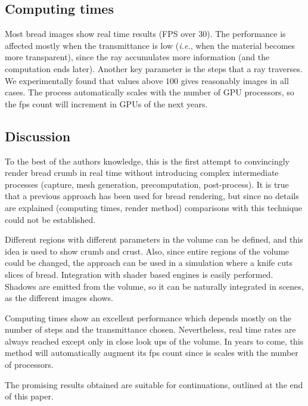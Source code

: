 \documentclass[oneside,a4paper,english,links]{amca}
\begin{document}
\subsection{Computing times}
Most bread images show real time results (FPS over 30). The performance is affected mostly when the transmittance is low ({\em i.e.}, when the material becomes more transparent), since the ray accumulates more information (and the computation ends later). Another key parameter is the steps that a ray traverses. We experimentally found that values above $100$ gives reasonably images in all cases. The process automatically scales with the number of GPU processors, so the fps count will increment in GPUs of the next years.

\subsection{Discussion}
To the best of the authors knowledge, this is the first attempt to convincingly render bread crumb in real time without introducing complex intermediate processes (capture, mesh generation, precomputation, post-process). It is true that a previous approach \citep{Cho2007} has been used for bread rendering, but since no details are explained (computing times, render method) comparisons with this technique could not be established.

Different regions with different parameters in the volume can be defined, and this idea is used to show crumb and crust. Also, since entire regions of the volume could be changed, the approach can be used in a simulation where a knife cuts slices of bread. Integration with shader based engines is easily performed. Shadows are emitted from the volume, so it can be naturally integrated in scenes, as the different images shows.

Computing times show an excellent performance which depends mostly on the number of steps and the transmittance chosen. Nevertheless, real time rates are always reached except only in close look ups of the volume. In years to come, this method will automatically augment its fps count since is scales with the number of processors.

The promising results obtained are suitable for continuations, outlined at the end of this paper.



\end{document}
